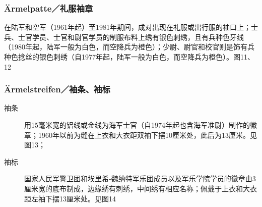 \subsubsection*{Ärmelpatte／礼服袖章}

在陆军和空军（1961年起）至1981年期间，成对出现在礼服或出行服的袖口上；士兵、士官学员、士官和尉官学员的制服布料上绣有银色刺绣，且有兵种色牙线（1980年起，陆军一般为白色，而空降兵为橙色）；少尉、尉官和校官则是饰有兵种色捻丝的银色刺绣（自1977年起，陆军一般为白色，而空降兵为橙色）。图11、12

\subsubsection*{Ärmelstreifen／袖条、袖标}

\begin{description}

    \item[袖条] 用15毫米宽的铝线或金线为海军士官（自1974年起也含海军准尉）制作的徽章；1960年以前为缝在上衣和大衣距双袖下摆10厘米处，此后为13厘米。见图13；

    \item[袖标] 国家人民军警卫团和埃里希-魏纳特军乐团成员以及军乐学院学员的徽章由3厘米宽的底布制成，边缘绣有刺绣，中间绣有相应名称；佩戴于上衣和大衣距左袖下摆13厘米处。见图14

\end{description}

